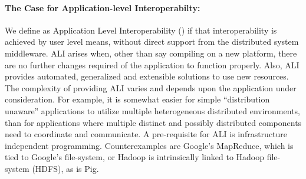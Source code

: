 \documentclass[3p,twocolumn]{elsarticle}
\begin{document}




\paragraph{The Case for Application-level Interoperabilty:}

We define as Application Level Interoperability () if that
interoperability is achieved by user level means, without direct support
from the distributed system middleware.  ALI arises when, other than say
compiling on a new platform, there are no further changes required of
the application to function properly.  Also, ALI provides automated,
generalized and extensible solutions to use new resources.
 The complexity of providing ALI varies and depends
upon the application under consideration.  For example, it is somewhat
easier for simple ``distribution unaware'' applications to utilize
multiple heterogeneous distributed environments, than for applications
where multiple distinct and possibly distributed components need to
coordinate and communicate.  A pre-requisite for ALI is infrastructure
independent programming.  Counterexamples are Google's MapReduce, which
is tied to Google's file-system, or Hadoop is intrinsically linked to
Hadoop file-system (HDFS), as is Pig.
\end{document}
